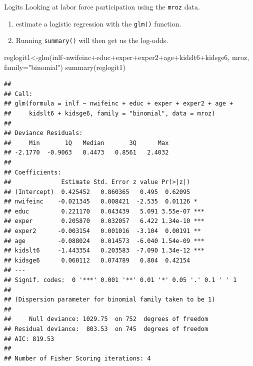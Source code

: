 \documentclass[
  ignorenonframetext,
]{beamer}
\newenvironment{Shaded}{\begin{snugshade}}{\end{snugshade}}
\newcommand{\AttributeTok}[1]{\textcolor[rgb]{0.77,0.63,0.00}{#1}}
\newcommand{\FunctionTok}[1]{\textcolor[rgb]{0.00,0.00,0.00}{#1}}
\newcommand{\NormalTok}[1]{#1}
\newcommand{\OtherTok}[1]{\textcolor[rgb]{0.56,0.35,0.01}{#1}}
\newcommand{\SpecialCharTok}[1]{\textcolor[rgb]{0.00,0.00,0.00}{#1}}
\newcommand{\StringTok}[1]{\textcolor[rgb]{0.31,0.60,0.02}{#1}}
\begin{document}
\begin{frame}[fragile]{Logits}
\protect\hypertarget{logits-6}{}
Looking at labor force participation using the \texttt{mroz} data.

\begin{enumerate}
[1)]
\item
  estimate a logistic regression with the \texttt{glm()} function.
\item
  Running \texttt{summary()} will then get us the log-odds.
\end{enumerate}

\tiny

\begin{Shaded}
\begin{Highlighting}[]
\NormalTok{reglogit1}\OtherTok{\textless{}{-}}\FunctionTok{glm}\NormalTok{(inlf}\SpecialCharTok{\textasciitilde{}}\NormalTok{nwifeinc}\SpecialCharTok{+}\NormalTok{educ}\SpecialCharTok{+}\NormalTok{exper}\SpecialCharTok{+}\NormalTok{exper2}\SpecialCharTok{+}\NormalTok{age}\SpecialCharTok{+}\NormalTok{kidslt6}\SpecialCharTok{+}\NormalTok{kidsge6, mroz, }\AttributeTok{family=}\StringTok{"binomial"}\NormalTok{)}
\FunctionTok{summary}\NormalTok{(reglogit1)}
\end{Highlighting}
\end{Shaded}

\begin{verbatim}
## 
## Call:
## glm(formula = inlf ~ nwifeinc + educ + exper + exper2 + age + 
##     kidslt6 + kidsge6, family = "binomial", data = mroz)
## 
## Deviance Residuals: 
##     Min       1Q   Median       3Q      Max  
## -2.1770  -0.9063   0.4473   0.8561   2.4032  
## 
## Coefficients:
##              Estimate Std. Error z value Pr(>|z|)    
## (Intercept)  0.425452   0.860365   0.495  0.62095    
## nwifeinc    -0.021345   0.008421  -2.535  0.01126 *  
## educ         0.221170   0.043439   5.091 3.55e-07 ***
## exper        0.205870   0.032057   6.422 1.34e-10 ***
## exper2      -0.003154   0.001016  -3.104  0.00191 ** 
## age         -0.088024   0.014573  -6.040 1.54e-09 ***
## kidslt6     -1.443354   0.203583  -7.090 1.34e-12 ***
## kidsge6      0.060112   0.074789   0.804  0.42154    
## ---
## Signif. codes:  0 '***' 0.001 '**' 0.01 '*' 0.05 '.' 0.1 ' ' 1
## 
## (Dispersion parameter for binomial family taken to be 1)
## 
##     Null deviance: 1029.75  on 752  degrees of freedom
## Residual deviance:  803.53  on 745  degrees of freedom
## AIC: 819.53
## 
## Number of Fisher Scoring iterations: 4
\end{verbatim}
\end{frame}
\end{document}
